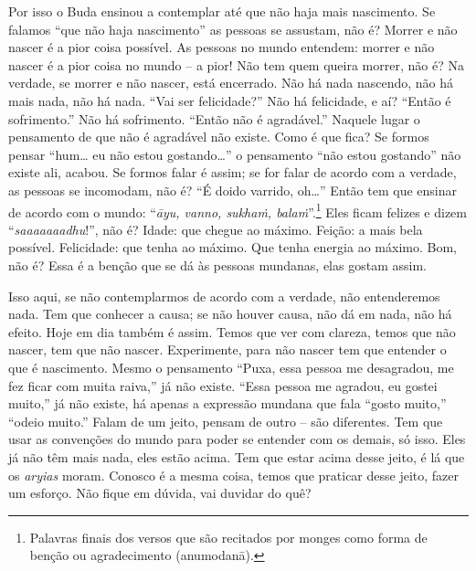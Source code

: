 Por isso o Buda ensinou a contemplar até que não haja mais
nascimento. Se falamos “que não haja nascimento” as pessoas se
assustam, não é? Morrer e não nascer é a pior coisa possível. As
pessoas no mundo entendem: morrer e não nascer é a pior coisa no mundo
– a pior! Não tem quem queira morrer, não é? Na verdade, se morrer e
não nascer, está encerrado. Não há nada nascendo, não há mais nada, não
há nada. “Vai ser felicidade?” Não há felicidade, e aí? “Então é
sofrimento.” Não há sofrimento. “Então não é agradável.” Naquele lugar
o pensamento de que não é agradável não existe. Como é que fica? Se
formos pensar “hum\ldots{} eu não estou gostando\ldots{}” o pensamento “não estou
gostando” não existe ali, acabou. Se formos falar é assim; se for falar
de acordo com a verdade, as pessoas se incomodam, não é? “É doido
varrido, oh\ldots{}” Então tem que ensinar de acordo com o mundo:
“\emph{āyu, vanno, sukhaṁ, balaṁ}”.\footnote{Palavras finais dos
versos que são recitados por monges como forma de benção ou
agradecimento (anumodanā).} Eles ficam felizes e dizem
“\emph{saaaaaaadhu}!”, não é? Idade: que chegue ao máximo. Feição: a
mais bela possível. Felicidade: que tenha ao máximo. Que tenha energia
ao máximo. Bom, não é? Essa é a benção que se dá às pessoas mundanas,
elas gostam assim. 

Isso aqui, se não contemplarmos de acordo com a verdade, não
entenderemos nada. Tem que conhecer a causa; se não houver causa, não
dá em nada, não há efeito. Hoje em dia também é assim. Temos que ver
com clareza, temos que não nascer, tem que não nascer. Experimente,
para não nascer tem que entender o que é nascimento. Mesmo o pensamento
“Puxa, essa pessoa me desagradou, me fez ficar com muita raiva,” já não
existe. “Essa pessoa me agradou, eu gostei muito,” já não existe, há
apenas a expressão mundana que fala “gosto muito,” “odeio muito.” Falam
de um jeito, pensam de outro – são diferentes. Tem que usar as
convenções do mundo para poder se entender com os demais, só isso. Eles
já não têm mais nada, eles estão acima. Tem que estar acima desse
jeito, é lá que os \emph{aryias} moram. Conosco é a mesma coisa,
temos que praticar desse jeito, fazer um esforço. Não fique em dúvida,
vai duvidar do quê? 

